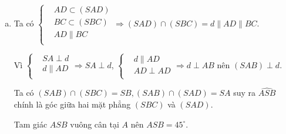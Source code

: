 \begin{bt}
{\begin{enumerate}[a.]
			Ta có $\tan \varphi =\dfrac{SA}{AD}=\dfrac{a}{a\sqrt{3}}=\dfrac{1}{\sqrt{3}}\Rightarrow \varphi ={30^\circ}$.
			
			\item Ta có $\left\{\begin{aligned}
				& AD\subset \left(SAD \right) \\ 
				& BC\subset \left(SBC \right) \\ 
				& AD\parallel BC \\ 
			\end{aligned} \right.\Rightarrow \left(SAD \right)\cap \left(SBC \right)=d\parallel AD\parallel BC$.
			
			Vì $\left\{\begin{aligned}
				& SA\perp d \\ 
				& d\parallel AD \\ 
			\end{aligned} \right.\Rightarrow SA\perp d$, $\left\{\begin{aligned}
				& d\parallel AD \\ 
				& AD\perp AD \\ 
			\end{aligned} \right.\Rightarrow d\perp AB$ nên $(SAB)\perp d$.
			
			Ta có $(SAB)\cap (SBC)=SB,(SAB)\cap (SAD)=SA$ suy ra $\widehat{ASB}$ chính là góc giữa hai mặt phẳng $(SBC)$ và $(SAD)$.
			
			Tam giác $ASB$ vuông cân tại $A$ nên $\widehat{ASB}={45^\circ}$.
		\end{enumerate}
		
	}
	
\end{bt}

